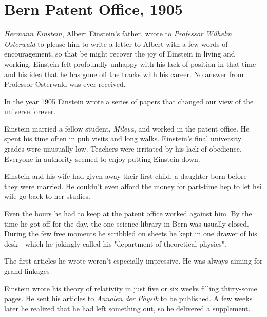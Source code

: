 %

\section{Bern Patent Office, 1905}

\emph{Hermann Einstein}, Albert Einstein's father, wrote to \emph{Professor Wilhelm Osterwald} to please him to write a letter to Albert with a few words of encouragement, so that be might recover the joy of Einstein in living and working. Einstein felt profoundly unhappy with his lack of position in that time and his idea that he has gone off the tracks with his career. No answer from Professor Osterwald was ever received.

In the year 1905 Einstein wrote a series of papers that changed our view of the universe forever.

Einstein married a fellow student, \emph{Mileva}, and worked in the patent office. He spent his time often in pub visits and long walks. Einstein's final university grades were unusually low. Teachers were irritated by his lack of obedience. Everyone in authority seemed to enjoy putting Einstein down.

Einstein and his wife had given away their first child, a daughter born before they were married. He couldn't even afford the money for part-time hep to let hsi wife go back to her studies.

Even the hours he had to keep at the patent office worked against him. By the time he got off for the day, the one science library in Bern was usually closed. During the few free moments he scribbled on sheets he kept in one drawer of his desk - which he jokingly called his "department of theoretical physics".

The first articles he wrote weren't especially impressive. He was always aiming for grand linkages

Einstein wrote his theory of relativity in just five or six weeks filling thirty-some pages. He sent his articles to \emph{Annalen der Physik} to be published. A few weeks later he realized that he had left something out, so he delivered a supplement.
